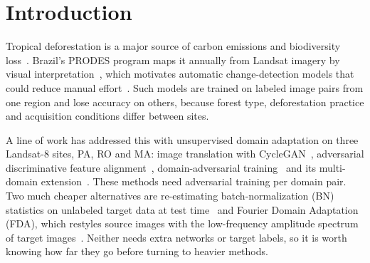 \documentclass[11pt]{article}
\begin{document}
\section{Introduction}\label{sec:intro}

Tropical deforestation is a major source of carbon emissions and biodiversity loss~\citep{hansen2013high,song2018global}.
Brazil's PRODES program maps it annually from Landsat imagery by visual interpretation~\citep{maurano2019padroes}, which motivates automatic change-detection models that could reduce manual effort~\citep{ortegaadarme2020evaluation,debem2020change}.
Such models are trained on labeled image pairs from one region and lose accuracy on others, because forest type, deforestation practice and acquisition conditions differ between sites.

A line of work has addressed this with unsupervised domain adaptation on three Landsat-8 sites, PA, RO and MA: image translation with CycleGAN~\citep{sotovega2021unsupervised}, adversarial discriminative feature alignment~\citep{noa2021adversarial}, domain-adversarial training~\citep{soto2022domain,sotovega2023weakly} and its multi-domain extension~\citep{demoura2025enhancing}.
These methods need adversarial training per domain pair.
Two much cheaper alternatives are re-estimating batch-normalization (BN) statistics on unlabeled target data at test time~\citep{schneider2020improving,nado2020evaluating} and Fourier Domain Adaptation (FDA), which restyles source images with the low-frequency amplitude spectrum of target images~\citep{yang2020fda}.
Neither needs extra networks or target labels, so it is worth knowing how far they go before turning to heavier methods.
\end{document}
